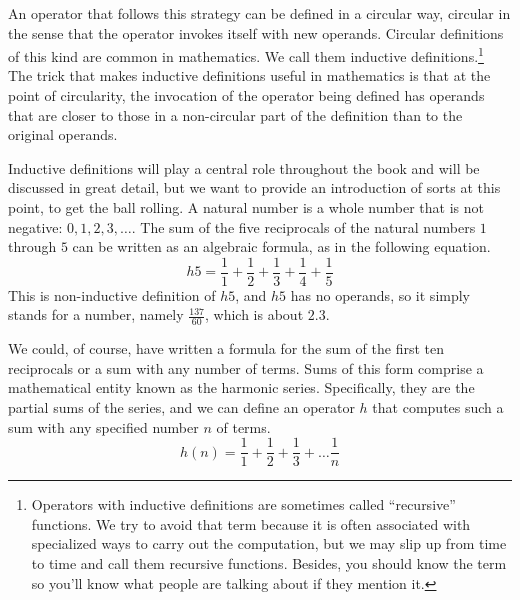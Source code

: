 An operator that follows this strategy can be defined
in a circular way, circular in the sense that
the operator invokes itself with new operands.
Circular definitions of this kind are common in mathematics.
We call them inductive definitions.\footnote{Operators with
inductive definitions
are sometimes called ``recursive'' functions.
We try to avoid that term because it is
often associated with specialized ways to carry out the computation,
but we may slip up from time to time and call them recursive functions.
Besides, you should know the term so you'll know what people are
talking about if they mention it.}
The trick that makes inductive definitions useful in mathematics
is that at the point of circularity,
the invocation of the operator being defined
has operands that are closer to those in a non-circular part of the
definition than to the original operands.

Inductive definitions
will play a central role throughout the book
and will be discussed in great detail, but we want to provide an
introduction of sorts at this point, to get the ball rolling.
A natural number is a whole number that is not negative: $0, 1, 2, 3, \dots$.
The sum of the five reciprocals of the
natural numbers $1$ through $5$
can be written as an algebraic formula, as in the following equation.
\begin{displaymath}
h5 = \frac{1}{1} + \frac{1}{2} + \frac{1}{3} + \frac{1}{4} + \frac{1}{5}
\end{displaymath}
This is non-inductive definition of $h5$,
and $h5$ has no operands, so it simply stands for a number,
namely $\frac{137}{60}$, which is about $2.3$.

We could, of course, have written a formula for the sum
of the first ten reciprocals or a sum with any number of terms.
Sums of this form comprise a mathematical entity known as
the harmonic series.
Specifically, they are the partial sums of the series,
and we can define an operator $h$ that computes such a sum
with any specified number $n$ of terms.
\begin{displaymath}
h(n) = \frac{1}{1} + \frac{1}{2} + \frac{1}{3} + \dots  \frac{1}{n}
\end{displaymath}

